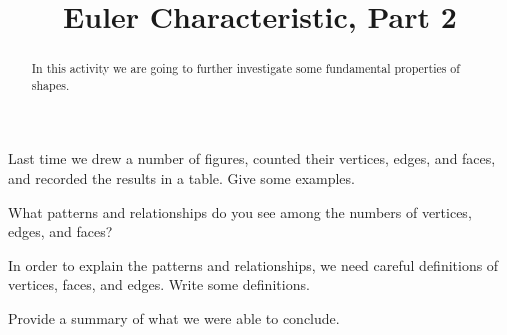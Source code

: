 \documentclass{ximera}
\title{Euler Characteristic, Part 2}
\begin{document}
\begin{abstract}
In this activity we are going to further investigate some fundamental
properties of shapes.
\end{abstract}
\maketitle

\begin{question}[3in]
Last time we drew a number of figures, counted their vertices, edges, and faces, and recorded the results in a table.  Give some examples. 
\begin{freeResponse}
\end{freeResponse}
\end{question}


\begin{question}[2in]
What patterns and relationships do you see among the numbers of vertices, edges, and faces?
\begin{freeResponse}
\end{freeResponse}
\end{question}


\begin{question}[3in]
In order to explain the patterns and relationships, we need careful definitions of vertices, faces, and edges.  Write some definitions.  
\begin{freeResponse}
\end{freeResponse}
\end{question}



\begin{question}
Provide a summary of what we were able to conclude.
\begin{freeResponse}
\end{freeResponse}
\end{question}
\end{document}
